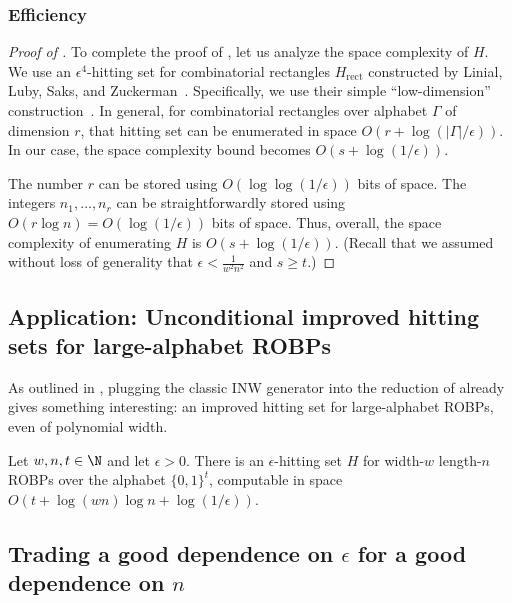 \documentclass{toc}
\begin{document}
\subsubsection{Efficiency}

\begin{proof}[Proof of ]
To complete the proof of , let us analyze the space complexity of $H$. We use an $\epsilon^4$-hitting set for combinatorial rectangles $H_{\text{rect}}$ constructed by Linial, Luby, Saks, and Zuckerman~\cite{LLSZ97}. Specifically, we use their simple ``low-dimension'' construction~\cite[Section 5]{LLSZ97}. In general, for combinatorial rectangles over alphabet $\Gamma$ of dimension $r$, that hitting set can be enumerated in space $O(r + \log(|\Gamma|/\epsilon))$. In our case, the space complexity bound becomes $O(s + \log(1/\epsilon))$.

The number $r$ can be stored using $O(\log \log(1/\epsilon))$ bits of space.
The integers $n_1, \dots, n_r$ can be straightforwardly stored using $O(r \log n) = O(\log(1/\epsilon))$ bits of space. Thus, overall, the space complexity of enumerating $H$ is $O(s + \log(1/\epsilon))$. (Recall that we assumed without loss of generality that $\epsilon < \frac{1}{w^2 n^2}$ and $s \geq t$.)
\end{proof}

\subsection{Application: Unconditional improved hitting sets for large-alphabet ROBPs}
As outlined in , plugging the classic INW generator \cite{INW94} into the reduction of  already gives something interesting: an improved hitting set for large-alphabet ROBPs, even of polynomial width.
\begin{corollary} \label{cor:large-alphabet-hz}
Let $w, n, t \in \N$ and let $\epsilon > 0$. There is an $\epsilon$-hitting set $H$ for width-$w$ length-$n$ ROBPs over the alphabet $\{0, 1\}^t$, computable in space $O(t + \log(wn) \log n + \log(1/\epsilon))$.
\end{corollary}

\subsection{Trading a good dependence on $\epsilon$ for a good dependence on $n$}
\end{document}
